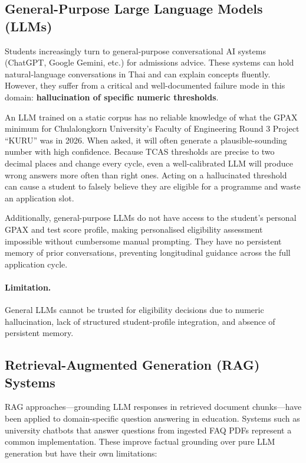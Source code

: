 ﻿\documentclass[12pt,a4paper]{article}
\begin{document}
\subsection{General-Purpose Large Language Models (LLMs)}

Students increasingly turn to general-purpose conversational AI systems (ChatGPT,
Google Gemini, etc.) for admissions advice. These systems can hold natural-language
conversations in Thai and can explain concepts fluently. However, they suffer from
a critical and well-documented failure mode in this domain: \textbf{hallucination of
specific numeric thresholds}.

An LLM trained on a static corpus has no reliable knowledge of what the GPAX
minimum for Chulalongkorn University's Faculty of Engineering Round 3 Project
``KURU'' was in 2026. When asked, it will often generate a plausible-sounding number
with high confidence. Because TCAS thresholds are precise to two decimal places and
change every cycle, even a well-calibrated LLM will produce wrong answers more often
than right ones. Acting on a hallucinated threshold can cause a student to falsely
believe they are eligible for a programme and waste an application slot.

Additionally, general-purpose LLMs do not have access to the student's personal
GPAX and test score profile, making personalised eligibility assessment impossible
without cumbersome manual prompting. They have no persistent memory of prior
conversations, preventing longitudinal guidance across the full application cycle.

\paragraph{Limitation.} General LLMs cannot be trusted for eligibility decisions
due to numeric hallucination, lack of structured student-profile integration, and
absence of persistent memory.

\subsection{Retrieval-Augmented Generation (RAG) Systems}

RAG approaches—grounding LLM responses in retrieved document chunks—have been
applied to domain-specific question answering in education. Systems such as
university chatbots that answer questions from ingested FAQ PDFs represent a common
implementation. These improve factual grounding over pure LLM generation but have
their own limitations:
\end{document}
